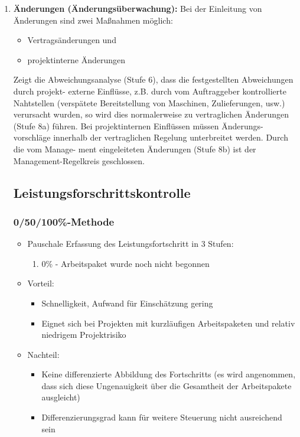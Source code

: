\documentclass[11pt,a4paper]{article}
\begin{document}
\begin{enumerate}
	\item \textbf{Änderungen (Änderungsüberwachung):} Bei der Einleitung von Änderungen sind zwei Maßnahmen möglich:
	\begin{itemize}
		\item Vertragsänderungen und
		\item projektinterne Änderungen
	\end{itemize}
	\noindent
	Zeigt die Abweichungsanalyse (Stufe 6), dass die festgestellten Abweichungen durch projekt-
externe Einflüsse, z.B. durch vom Auftraggeber kontrollierte Nahtstellen (verspätete Bereitstellung
von Maschinen, Zulieferungen, usw.) verursacht wurden, so wird dies normalerweise zu
vertraglichen Änderungen (Stufe 8a) führen. Bei projektinternen Einflüssen müssen Änderungs-
vorschläge innerhalb der vertraglichen Regelung unterbreitet werden. Durch die vom Manage-
ment eingeleiteten Änderungen (Stufe 8b) ist der Management-Regelkreis geschlossen.



\subsection{Leistungsforschrittskontrolle}

\subsubsection{0/50/100\%-Methode}

\begin{itemize}
	\item Pauschale Erfassung des Leistungsfortschritt in 3 Stufen:
		\begin{enumerate}
			\item 0\% - Arbeitspaket wurde noch nicht begonnen
		\end{enumerate}
	\item Vorteil:
		\begin{itemize}
			\item Schnelligkeit, Aufwand für Einschätzung gering
			\item Eignet sich bei Projekten mit kurzläufigen Arbeitspaketen und relativ niedrigem Projektrisiko
		\end{itemize}
		
	\item Nachteil:
		\begin{itemize}
			\item Keine differenzierte Abbildung des Fortschritts (es wird
angenommen, dass sich diese Ungenauigkeit über die
Gesamtheit der Arbeitspakete ausgleicht)
			\item Differenzierungsgrad kann für weitere Steuerung nicht
ausreichend sein
		\end{itemize}
\end{itemize}
	
\end{enumerate}
\end{document}
